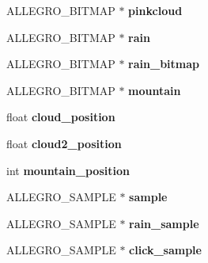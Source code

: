 \begin{DoxyCompactItemize}
\item 
\hypertarget{structMenu_aec110fca9c47ccf9aaf6e4e7589b86f2}{\-A\-L\-L\-E\-G\-R\-O\-\_\-\-B\-I\-T\-M\-A\-P $\ast$ {\bfseries pinkcloud}}\label{structMenu_aec110fca9c47ccf9aaf6e4e7589b86f2}

\item 
\hypertarget{structMenu_a3ba357f6bd47ac51f9aa9b9c381bbe9f}{\-A\-L\-L\-E\-G\-R\-O\-\_\-\-B\-I\-T\-M\-A\-P $\ast$ {\bfseries rain}}\label{structMenu_a3ba357f6bd47ac51f9aa9b9c381bbe9f}

\item 
\hypertarget{structMenu_a9207cdbfc8c670d9069c9a2c64c6ca95}{\-A\-L\-L\-E\-G\-R\-O\-\_\-\-B\-I\-T\-M\-A\-P $\ast$ {\bfseries rain\-\_\-bitmap}}\label{structMenu_a9207cdbfc8c670d9069c9a2c64c6ca95}

\item 
\hypertarget{structMenu_a3a957c0b3a961e3c2be9001c15e82208}{\-A\-L\-L\-E\-G\-R\-O\-\_\-\-B\-I\-T\-M\-A\-P $\ast$ {\bfseries mountain}}\label{structMenu_a3a957c0b3a961e3c2be9001c15e82208}

\item 
\hypertarget{structMenu_a0e6c60743147ff2ead1e0bb2f89d0036}{float {\bfseries cloud\-\_\-position}}\label{structMenu_a0e6c60743147ff2ead1e0bb2f89d0036}

\item 
\hypertarget{structMenu_a143c3675204c7cf1381decbfe4be5476}{float {\bfseries cloud2\-\_\-position}}\label{structMenu_a143c3675204c7cf1381decbfe4be5476}

\item 
\hypertarget{structMenu_a10770a9453a92c77d64c7fdb0e34e725}{int {\bfseries mountain\-\_\-position}}\label{structMenu_a10770a9453a92c77d64c7fdb0e34e725}

\item 
\hypertarget{structMenu_a19a25811d2d08b8fa1d1819088168b72}{\-A\-L\-L\-E\-G\-R\-O\-\_\-\-S\-A\-M\-P\-L\-E $\ast$ {\bfseries sample}}\label{structMenu_a19a25811d2d08b8fa1d1819088168b72}

\item 
\hypertarget{structMenu_ad14705d9172d76dc241de8f4657254cc}{\-A\-L\-L\-E\-G\-R\-O\-\_\-\-S\-A\-M\-P\-L\-E $\ast$ {\bfseries rain\-\_\-sample}}\label{structMenu_ad14705d9172d76dc241de8f4657254cc}

\item 
\hypertarget{structMenu_a012f284df5f9d8e39785a264c736c506}{\-A\-L\-L\-E\-G\-R\-O\-\_\-\-S\-A\-M\-P\-L\-E $\ast$ {\bfseries click\-\_\-sample}}\label{structMenu_a012f284df5f9d8e39785a264c736c506}


\end{DoxyCompactItemize}
